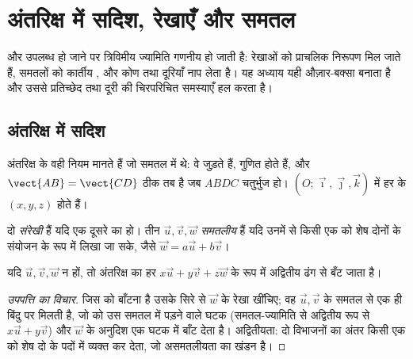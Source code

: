 \chapter{अंतरिक्ष में सदिश, रेखाएँ और समतल}\label{ch:g12:space}

 और  उपलब्ध हो जाने पर त्रिविमीय ज्यामिति गणनीय हो जाती है:
रेखाओं को प्राचलिक निरूपण मिल जाते हैं, समतलों को कार्तीय , और  कोण तथा दूरियाँ नाप लेता है। यह अध्याय यही औज़ार-बक्सा बनाता है और
उससे प्रतिच्छेद तथा दूरी की चिरपरिचित समस्याएँ हल करता है।

\section{अंतरिक्ष में सदिश}

अंतरिक्ष के  वही नियम मानते हैं जो समतल में थे: वे जुड़ते हैं, गुणित होते
हैं, और $\vect{AB} = \vect{CD}$ ठीक तब है जब $ABDC$  चतुर्भुज हो।  $(O; \vec\imath, \vec\jmath, \vec k)$ में हर
 के  $(x, y, z)$ होते हैं।

\begin{definition}[संरेखता, समतलीयता]\label{def:g12:space:collinear}
दो  \emph{संरेखी} हैं यदि एक दूसरे का  हो। तीन  $\vec u, \vec v, \vec w$
\emph{समतलीय} हैं यदि उनमें से किसी एक को शेष दोनों के संयोजन
के रूप में लिखा जा सके, जैसे $\vec w = a\vec u + b\vec v$।
\end{definition}

\begin{proposition}\label{prop:g12:space:basis}
यदि $\vec u, \vec v, \vec w$  न हों, तो अंतरिक्ष का हर  $x\vec u + y\vec v + z\vec w$ के रूप में अद्वितीय ढंग से
बँट जाता है।
\end{proposition}

\begin{proof}[उपपत्ति का विचार]
जिस  को बाँटना है उसके सिरे से $\vec w$ के  रेखा खींचिए; वह $\vec u, \vec v$ के
समतल से एक ही बिंदु पर मिलती है, जो  को उस समतल में पड़ने वाले घटक
(समतल-ज्यामिति से अद्वितीय रूप से $x\vec u + y\vec
v$) और $\vec w$ के अनुदिश एक घटक में बाँट
देता है। अद्वितीयता: दो विभाजनों का अंतर किसी एक  को शेष दो के पदों में
व्यक्त कर देता, जो असमतलीयता का खंडन है।
\end{proof}

